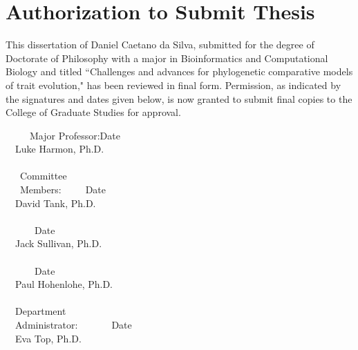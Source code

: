\section*{\large{Authorization to Submit Thesis}}
\begin{flushleft}
This dissertation of Daniel Caetano da Silva, submitted for the degree of Doctorate of Philosophy with a major in Bioinformatics and Computational Biology and titled ``Challenges and advances for phylogenetic comparative models of trait evolution," has been reviewed in final form. Permission, as indicated by the signatures and dates given below, is now granted to submit final copies to the College of Graduate Studies for approval.
\end{flushleft}
\begin{singlespace}
\ \ \ \ \ Major Professor:\indent\underline{\makebox[2.8in][l]{\ }}Date\underline{\makebox[1.2in][l]{\ }}\\
\ \ \indent\indent\indent\indent\indent\indent\indent Luke Harmon, Ph.D.\\
\ \\
\ \ \ \indent Committee\\
\ \ \ \indent Members:\indent\indent\ \ \ \ \ \underline{\makebox[2.8in][l]{\ }}Date\underline{\makebox[1.2in][l]{\ }}\\
\ \ \indent\indent\indent\indent\indent\indent\indent David Tank, Ph.D.\\
\ \\
\ \ \indent\indent\indent\indent\indent\indent\ \ \ \ \underline{\makebox[2.8in][l]{\ }}Date\underline{\makebox[1.2in][l]{\ }}\\
\ \ \indent\indent\indent\indent\indent\indent\indent Jack Sullivan, Ph.D.\\
\ \\
\ \ \indent\indent\indent\indent\indent\indent\ \ \ \ \underline{\makebox[2.8in][l]{\ }}Date\underline{\makebox[1.2in][l]{\ }}\\
\ \ \indent\indent\indent\indent\indent\indent\indent Paul Hohenlohe, Ph.D.\\
\ \\
\ \ \indent Department\\
\ \ \indent Administrator:\ \ \ \ \ \ \ \underline{\makebox[2.8in][l]{\ }}Date\underline{\makebox[1.2in][l]{\ }}\\
\ \ \indent\indent\indent\indent\indent\indent\indent Eva Top, Ph.D.\\

\end{singlespace}
\pagebreak

